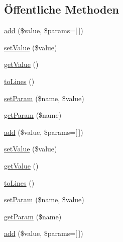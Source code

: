 \subsection*{Öffentliche Methoden}
\begin{DoxyCompactItemize}
\item 
\mbox{\hyperlink{class_eluceo_1_1i_cal_1_1_property_1_1_event_1_1_attendees_a76607267c05bd6dc2b735b50bdd5a229}{add}} (\$value, \$params=\mbox{[}$\,$\mbox{]})
\item 
\mbox{\hyperlink{class_eluceo_1_1i_cal_1_1_property_1_1_event_1_1_attendees_a9e8601c18fb1556c268b2c5ee355a373}{set\+Value}} (\$value)
\item 
\mbox{\hyperlink{class_eluceo_1_1i_cal_1_1_property_1_1_event_1_1_attendees_a17eed43b29bbf46dd988352929ff989b}{get\+Value}} ()
\item 
\mbox{\hyperlink{class_eluceo_1_1i_cal_1_1_property_1_1_event_1_1_attendees_a7edb50bd87ab091d6ed6d296634e85e5}{to\+Lines}} ()
\item 
\mbox{\hyperlink{class_eluceo_1_1i_cal_1_1_property_1_1_event_1_1_attendees_a9887bbe557ea9aa53f7f3bf1fb809928}{set\+Param}} (\$name, \$value)
\item 
\mbox{\hyperlink{class_eluceo_1_1i_cal_1_1_property_1_1_event_1_1_attendees_a181c7789d94b49f055714a380472200b}{get\+Param}} (\$name)
\item 
\mbox{\hyperlink{class_eluceo_1_1i_cal_1_1_property_1_1_event_1_1_attendees_a76607267c05bd6dc2b735b50bdd5a229}{add}} (\$value, \$params=\mbox{[}$\,$\mbox{]})
\item 
\mbox{\hyperlink{class_eluceo_1_1i_cal_1_1_property_1_1_event_1_1_attendees_a9e8601c18fb1556c268b2c5ee355a373}{set\+Value}} (\$value)
\item 
\mbox{\hyperlink{class_eluceo_1_1i_cal_1_1_property_1_1_event_1_1_attendees_a17eed43b29bbf46dd988352929ff989b}{get\+Value}} ()
\item 
\mbox{\hyperlink{class_eluceo_1_1i_cal_1_1_property_1_1_event_1_1_attendees_a7edb50bd87ab091d6ed6d296634e85e5}{to\+Lines}} ()
\item 
\mbox{\hyperlink{class_eluceo_1_1i_cal_1_1_property_1_1_event_1_1_attendees_a9887bbe557ea9aa53f7f3bf1fb809928}{set\+Param}} (\$name, \$value)
\item 
\mbox{\hyperlink{class_eluceo_1_1i_cal_1_1_property_1_1_event_1_1_attendees_a181c7789d94b49f055714a380472200b}{get\+Param}} (\$name)
\item 
\mbox{\hyperlink{class_eluceo_1_1i_cal_1_1_property_1_1_event_1_1_attendees_a76607267c05bd6dc2b735b50bdd5a229}{add}} (\$value, \$params=\mbox{[}$\,$\mbox{]})

\end{DoxyCompactItemize}
